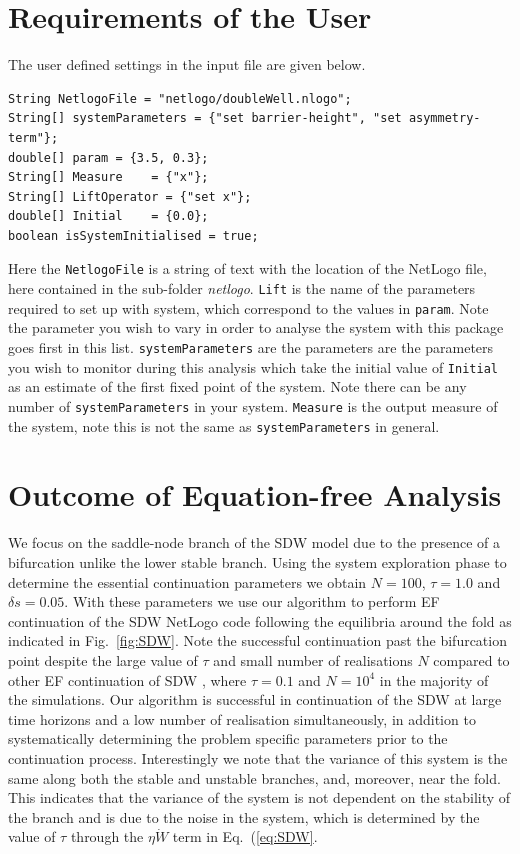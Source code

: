 \documentclass[11pt]{article}
\begin{document}
\section{Requirements of the User}
The user defined settings in the input file are given below. 
\begin{lstlisting}
String NetlogoFile = "netlogo/doubleWell.nlogo"; 
String[] systemParameters = {"set barrier-height", "set asymmetry-term"}; 
double[] param = {3.5, 0.3};  
String[] Measure	= {"x"};
String[] LiftOperator = {"set x"}; 
double[] Initial	= {0.0}; 
boolean isSystemInitialised = true;  
\end{lstlisting}		
	Here the {\tt NetlogoFile} is a string of text with the location of the NetLogo file, here contained in the sub-folder {\it netlogo}. {\tt Lift} is the name of the parameters required to set up with system, which correspond to the values in {\tt param}. Note the parameter you wish to vary in order to analyse the system with this package goes first in this list. {\tt systemParameters} are the parameters are the parameters you wish to monitor during this analysis which take the initial value of {\tt Initial} as an estimate of the first fixed point of the system. Note there can be any number of {\tt systemParameters} in your system. {\tt Measure} is the output measure of the system, note this is not the same as {\tt systemParameters} in general.

\section{Outcome of Equation-free Analysis}

We focus on the saddle-node branch of the SDW model due to the presence of a bifurcation unlike the lower stable branch. Using the system exploration phase to determine the essential continuation parameters we obtain $N=100$, $\tau=1.0$ and $\delta s=0.05$. With these parameters we use our algorithm to perform EF continuation of the SDW NetLogo code following the equilibria around the fold as indicated in Fig.~\ref{fig:SDW}. Note the successful continuation past the bifurcation point despite the large value of $\tau$ and small number of realisations $N$ compared to other EF continuation of SDW \cite{Barkley2006}, where $\tau=0.1$ and $N=10^4$ in the majority of the simulations. Our algorithm is successful in continuation of the SDW at large time horizons and a low number of realisation simultaneously, in addition to systematically determining the problem specific parameters prior to the continuation process. Interestingly we note that the variance of this system is the same along both the stable and unstable branches, and, moreover, near the fold. This indicates that the variance of the system is not dependent on the stability of the branch and is due to the noise in the system, which is determined by the value of $\tau$ through the $\eta\dot{W}$ term in Eq.~(\ref{eq:SDW}. 
\end{document}
